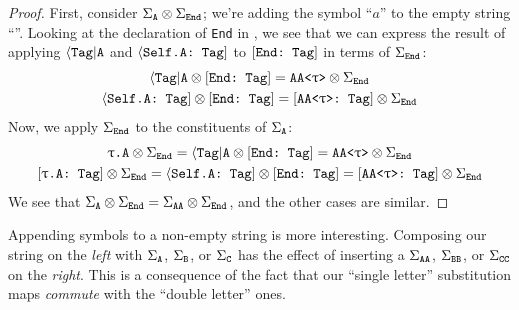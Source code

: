 \documentclass[../generics]{subfiles}
\begin{document}
\begin{proof}
First, consider $\Sigma_{\texttt{A}}\otimes\Sigma_{\texttt{End}}$; we're adding the symbol ``$a$'' to the empty string ``''. Looking at the declaration of \texttt{End} in , we see that we can express the result of applying $\langle\texttt{Tag}|\texttt{A}$ and $\langle\texttt{Self.A:~Tag}]$ to $[\texttt{End:~Tag}]$ in terms of $\Sigma_{\texttt{End}}$:
\begin{gather*}
\langle\texttt{Tag}|\texttt{A} \otimes [\texttt{End:~Tag}] = \texttt{AA<$\uptau$>} \otimes \Sigma_{\texttt{End}}\\
\langle\texttt{Self.A:~Tag}] \otimes [\texttt{End:~Tag}] = [\texttt{AA<$\uptau$>:~Tag}] \otimes \Sigma_{\texttt{End}}
\end{gather*}
Now, we apply $\Sigma_{\texttt{End}}$ to the constituents of $\Sigma_{\texttt{A}}$:
\begin{gather*}
\texttt{$\uptau$.A} \otimes \SigmaEnd = \AssocTypeA \otimes \ConfEndTag = \texttt{AA<$\uptau$>} \otimes \SigmaEnd\\
\ConfReq{$\uptau$.A}{Tag} \otimes \SigmaEnd = \AssocConfATag \otimes \ConfEndTag = \ConfAATag \otimes \SigmaEnd
\end{gather*}
We see that $\Sigma_{\texttt{A}}\otimes\Sigma_{\texttt{End}}=\Sigma_{\texttt{AA}}\otimes\Sigma_{\texttt{End}}$, and the other cases are similar.
\end{proof}

Appending symbols to a non-empty string is more interesting. Composing our string on the \emph{left} with $\Sigma_{\texttt{A}}$, $\Sigma_{\texttt{B}}$, or $\Sigma_{\texttt{C}}$ has the effect of inserting a $\Sigma_{\texttt{AA}}$, $\Sigma_{\texttt{BB}}$, or $\Sigma_{\texttt{CC}}$ on the \emph{right}. This is a consequence of the fact that our ``single letter'' substitution maps \emph{commute} with the ``double letter'' ones.
\end{document}

